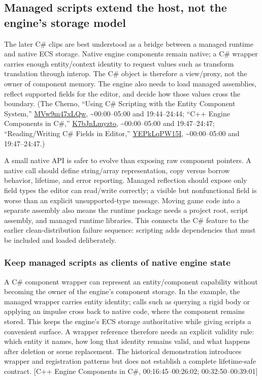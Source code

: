 \subsection{Managed scripts extend the host, not the engine's storage model}\label{06-engine-ii-ch040-managed-scripts-extend-the-host-not-the-engines-storage-model}

The later C\# clips are best understood as a bridge between a managed runtime and native ECS storage. Native engine components remain native; a C\# wrapper carries enough entity/context identity to request values such as transform translation through interop. The C\# object is therefore a view/proxy, not the owner of component memory. The engine also needs to load managed assemblies, reflect supported fields for the editor, and decide how those values cross the boundary. (The Cherno, ``Using C\# Scripting with the Entity Component System,'' \href{https://www.youtube.com/watch?v=MVw9m47xLQw}{MVw9m47xLQw}, \textasciitilde00:00--05:00 and 19:44--24:44; ``C++ Engine Components in C\#,'' \href{https://www.youtube.com/watch?v=K7bJnLmyzto}{K7bJnLmyzto}, \textasciitilde00:00--05:00 and 19:47--24:47; ``Reading/Writing C\# Fields in Editor,'' \href{https://www.youtube.com/watch?v=YEPkLqPW15I}{YEPkLqPW15I}, \textasciitilde00:00--05:00 and 19:47--24:47.)

A small native API is safer to evolve than exposing raw component pointers. A native call should define string/array representation, copy versus borrow behavior, lifetime, and error reporting. Managed reflection should expose only field types the editor can read/write correctly; a visible but nonfunctional field is worse than an explicit unsupported-type message. Moving game code into a separate assembly also means the runtime package needs a project root, script assembly, and managed runtime libraries. This connects the C\# feature to the earlier clean-distribution failure sequence: scripting adds dependencies that must be included and loaded deliberately.

\subsubsection{Keep managed scripts as clients of native engine state}\label{06-engine-ii-ch040-keep-managed-scripts-as-clients-of-native-engine-state}

A C\# component wrapper can represent an entity/component capability without becoming the owner of the engine's component storage. In the example, the managed wrapper carries entity identity; calls such as querying a rigid body or applying an impulse cross back to native code, where the component remains stored. This keeps the engine's ECS storage authoritative while giving scripts a convenient surface. A wrapper reference therefore needs an explicit validity rule: which entity it names, how long that identity remains valid, and what happens after deletion or scene replacement. The historical demonstration introduces wrapper and registration patterns but does not establish a complete lifetime-safe contract. {[}C++ Engine Components in C\#, 00:16:45--00:26:02; 00:32:50--00:39:01{]}

